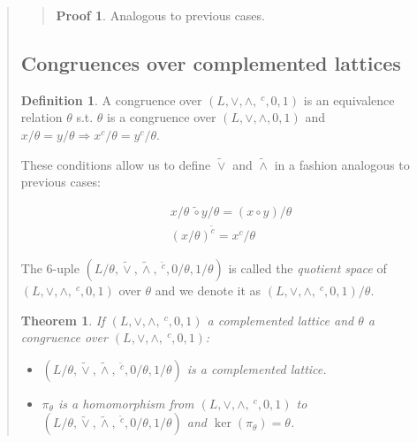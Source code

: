 \documentclass[a4paper, 12pt]{article}
\newtheorem{theorem}{Theorem}
\theoremstyle{definition}
\theoremstyle{definition}
\theoremstyle{definition}
\newtheorem{definition}{Definition}
\newtheorem{pro}{Proof}
\DeclareMathOperator{\ker}{ker}
\begin{document}
\begin{quote}
\small
\begin{quote}

\begin{pro}
    Analogous to previous cases.
\end{pro}

\end{quote}
\normalsize

\subsection{Congruences over complemented lattices}

\begin{definition}
    A congruence over $(L, \lor, \land, ~^c, 0, 1)$ is an equivalence 
    relation $\theta$ s.t. $\theta$ is a congruence over 
    $(L, \lor, \land, 0, 1)$ and $x / \theta = y /\theta \Rightarrow x^c / \theta = y^c / \theta$.
\end{definition}

These conditions allow us to define $\widetilde{ \lor  } $ and $\widetilde{ \land  } $ in a fashion analogous to previous cases:

\begin{align*}
    &x / \theta ~ \widetilde{ \circ } y / \theta = (x \circ y) / \theta \\ 
    &(x / \theta)^{\widetilde{ c } } = x^c / \theta
\end{align*}

The $6$-uple $(L / \theta, \widetilde{\lor}, \widetilde{ \land}, ~^{\widetilde{
c }},  0 / \theta, 1/ \theta)$ is called the \textit{quotient space} of $(L,
\lor, \land, ~^c, 0, 1)$ over $\theta$ and we denote it as $(L, \lor, \land,
~^c, 0, 1) / \theta$.

\begin{theorem}
    If $(L, \lor, \land, ~^c, 0, 1)$ a complemented lattice and $\theta$ 
    a congruence over $(L, \lor, \land, ~^c, 0, 1)$:

    \begin{itemize}
        \item $(L / \theta, \widetilde{\lor}, \widetilde{ \land}, ~^{\widetilde{ c } }, 0 / \theta, 1/ \theta)$ is a complemented lattice. 
        \item $\pi_{\theta}$ is a homomorphism from $(L, \lor, \land, ~^c, 0, 1)$ to $(L / \theta, \widetilde{\lor}, \widetilde{ \land}, ~^{\widetilde{ c } } , 0 / \theta, 1/ \theta)$ and $\ker(\pi_\theta) = \theta$.
    \end{itemize}
\end{theorem}



\end{quote}
\end{document}
